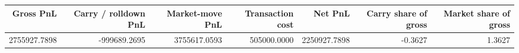 \begin{tabular}{rrrrrrr}
\toprule
Gross PnL & Carry / rolldown PnL & Market-move PnL & Transaction cost & Net PnL & Carry share of gross & Market share of gross \\
\midrule
2755927.7898 & -999689.2695 & 3755617.0593 & 505000.0000 & 2250927.7898 & -0.3627 & 1.3627 \\
\bottomrule
\end{tabular}
